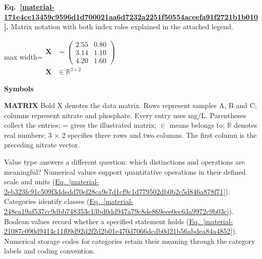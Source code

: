 \documentclass[11pt,a4paper]{article}
\begin{document}
\par\medskip
\begin{samepage}
\label{material-171e4ce13459c9596d1d700021aa6d7232a2251f50554aceefa91f2721b1b010}
\noindent\textbf{Eq.~\ref*{material-171e4ce13459c9596d1d700021aa6d7232a2251f50554aceefa91f2721b1b010}.} Matrix notation with both index roles explained in the attached legend.\par\nopagebreak
\begin{center}\begin{adjustbox}{max width=\linewidth}$\displaystyle \begin{aligned}\mathbf{X} &= \begin{pmatrix}2.55 & 0.80\\3.14 & 1.10\\4.20 & 1.60\end{pmatrix}\\ \mathbf{X} &\in \mathbb{R}^{3\times2}\end{aligned}$\end{adjustbox}\end{center}

\par\noindent\textbf{Symbols}

\par\noindent\textbf{MATRIX} Bold X denotes the data matrix. Rows represent samples A, B and C; columns represent nitrate and phosphate. Every entry uses mg/L. Parentheses collect the entries; = gives the illustrated matrix; \ensuremath{\in} means belongs to; \ensuremath{\mathbb{R}} denotes real numbers; 3 \ensuremath{\times} 2 specifies three rows and two columns. The first column is the preceding nitrate vector.

\end{samepage}
\medskip

Value type answers a different question: which distinctions and operations are meaningful? Numerical values support quantitative operations in their defined scale and units (\hyperref[material-2eb323fc91c509f3ddedd70ef28ca9e7d1cf9c1d779502db0b2c5d846a878f71]{Eq.~\ref*{material-2eb323fc91c509f3ddedd70ef28ca9e7d1cf9c1d779502db0b2c5d846a878f71}}). Categories identify classes (\hyperref[material-248ea19af537cc9dbb748353c13bd0dd947a79c8de869eee0ec63a9972c9b03c]{Eq.~\ref*{material-248ea19af537cc9dbb748353c13bd0dd947a79c8de869eee0ec63a9972c9b03c}}). Boolean values record whether a specified statement holds (\hyperref[material-21087c090d9414c11f09d92d2f2d2b01e470d7066dcdb0d21b56abdea84a4852]{Eq.~\ref*{material-21087c090d9414c11f09d92d2f2d2b01e470d7066dcdb0d21b56abdea84a4852}}). Numerical storage codes for categories retain their meaning through the category labels and coding convention.
\end{document}
